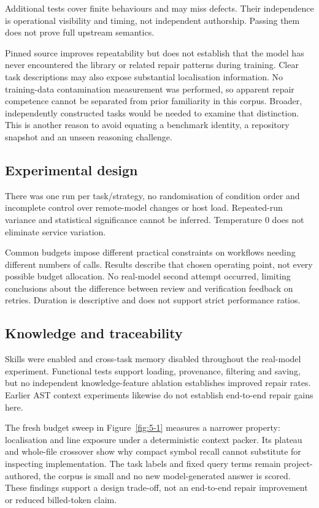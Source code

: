 Additional tests cover finite behaviours and may miss defects. Their independence is operational visibility and timing, not independent authorship. Passing them does not prove full upstream semantics.

Pinned source improves repeatability but does not establish that the model has never encountered the library or related repair patterns during training. Clear task descriptions may also expose substantial localisation information. No training-data contamination measurement was performed, so apparent repair competence cannot be separated from prior familiarity in this corpus. Broader, independently constructed tasks would be needed to examine that distinction. This is another reason to avoid equating a benchmark identity, a repository snapshot and an unseen reasoning challenge. \citep{legoues2015manybugs, wong2016localization}

\subsection{Experimental design}\label{sec:7.4.2}

There was one run per task/strategy, no randomisation of condition order and incomplete control over remote-model changes or host load. Repeated-run variance and statistical significance cannot be inferred. Temperature 0 does not eliminate service variation.

Common budgets impose different practical constraints on workflows needing different numbers of calls. Results describe that chosen operating point, not every possible budget allocation. No real-model second attempt occurred, limiting conclusions about the difference between review and verification feedback on retries. Duration is descriptive and does not support strict performance ratios.

\subsection{Knowledge and traceability}\label{sec:7.4.3}

Skills were enabled and cross-task memory disabled throughout the real-model experiment. Functional tests support loading, provenance, filtering and saving, but no independent knowledge-feature ablation establishes improved repair rates. Earlier AST context experiments likewise do not establish end-to-end repair gains here.

The fresh budget sweep in Figure~\ref{fig:5-1} measures a narrower property: localisation and line exposure under a deterministic context packer. Its plateau and whole-file crossover show why compact symbol recall cannot substitute for inspecting implementation. The task labels and fixed query terms remain project-authored, the corpus is small and no new model-generated answer is scored. These findings support a design trade-off, not an end-to-end repair improvement or reduced billed-token claim.

